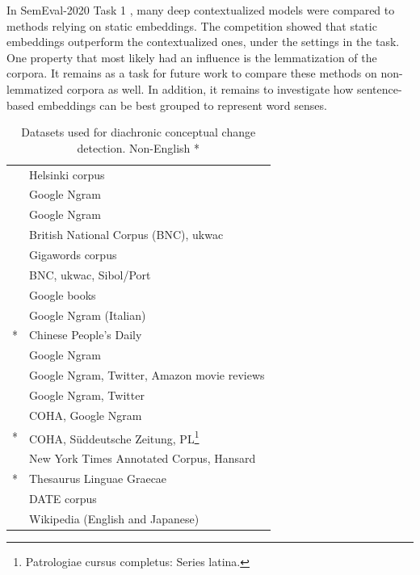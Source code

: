 \documentclass[output=paper]{langsci/langscibook}
\begin{document}
In SemEval-2020 Task 1 \citep{schlechtweg-etal-2020-semeval}, many deep contextualized models were compared to methods relying on static embeddings. The competition showed that static embeddings outperform the contextualized ones, under the settings in the task. One property that most likely had an influence is the lemmatization of the corpora. It remains as a task for future work to compare these methods on non-lemmatized corpora as well.
In addition, it remains to investigate how sentence-based embeddings can be best grouped to represent word senses. 

\begin{table}
\small
\caption{Datasets used for diachronic conceptual change detection.  Non-English *}\label{tab:datasets}
\begin{tabularx}{\textwidth}{lQ}
\lsptoprule
\citet{sagi-etal-2009-semantic} & Helsinki corpus\\
\citet{gulordava-baroni-2011-distributional} & Google Ngram\\
\citet{wijaya2011understanding} & Google Ngram\\
\citet{lau-etal-2012-word} & British National Corpus (BNC), ukwac\\
\citet{cook13alexicographic} & Gigawords corpus\\
\citet{cook-etal-2014-novel} & BNC, ukwac, Sibol/Port\\
\citet{mihalcea_wordepochdis} & Google books\\
\citet{basilediachronic} & Google Ngram (Italian)\\
\citet{tang2013,tang2016}* & Chinese People's Daily\\
\citet{kim-etal-2014-temporal} & Google Ngram\\
\citet{kulkarni2015statistically} & Google Ngram, Twitter, Amazon movie reviews\\
\citet{mitra2015automatic}& Google Ngram, Twitter\\
\citet{hamilton-etal-2016-diachronic} & COHA, Google Ngram\\ 
\citet{eger-mehler-2016-linearity}* & COHA, S\"uddeutsche Zeitung, PL\footnote{Patrologiae cursus completus: Series latina.}\\
\citet{wordsaremalleable} & New York Times Annotated Corpus, Hansard\\ 
\citet{rodda2016panta-journal}* & Thesaurus Linguae Graecae\\
\citet{frermann-lapata-2016-bayesian} & DATE corpus\\ 
\citet{japnloanwords} & Wikipedia (English and Japanese)\\

\end{tabularx}
\end{table}
\end{document}
